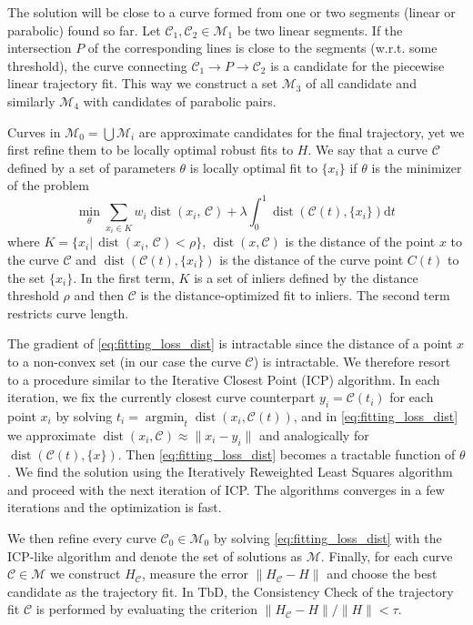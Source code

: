 \documentclass[10pt,twocolumn,letterpaper]{article}
\newcommand{\C}{\mathcal{C}}
\begin{document}
The solution will be close to a curve formed from one or two segments (linear or parabolic) found so far. Let $\C_1, \C_2 \in \mathcal{M}_1$ be two linear segments. If the intersection $P$ of the corresponding lines is close to the segments (w.r.t. some threshold), the curve connecting $\mathcal{C}_1\to P\to\mathcal{C}_2$ is a candidate for the piecewise linear trajectory fit. This way we construct a set $\mathcal{M}_3$ of all candidate and similarly $\mathcal{M}_4$ with candidates of parabolic pairs.

Curves in $\mathcal{M}_0=\bigcup\mathcal{M}_i$ are approximate candidates for the final trajectory, yet we first refine them to be locally optimal robust fits to $H$. We say that a curve $\mathcal{C}$ defined by a set of parameters $\theta$ is locally optimal fit to $\{x_i\}$ if $\theta$ is the minimizer of the problem
\begin{equation}
	\label{eq:fitting_loss_dist}
	\min_\theta \sum_{x_i\in K} w_i\operatorname{dist}(x_i,\,\mathcal{C}) + \lambda\int_0^1\operatorname{dist}(\mathcal{C}(t), \{x_i\})\mathrm{d}t\,
\end{equation}
where $K=\{x_i|\,\operatorname{dist}(x_i,\,\mathcal{C})<\rho\}$, $\operatorname{dist}(x, \C)$ is the distance of the point $x$ to the curve $\C$ and $\operatorname{dist}(\C(t), \{x_i\})$ is the distance of the curve point $C(t)$ to the set $\{x_i\}$. In the first term, $K$ is a set of inliers defined by the distance threshold $\rho$ and then $\C$ is the distance-optimized fit to inliers. The second term restricts curve length.

The gradient of \eqref{eq:fitting_loss_dist} is intractable since the distance of a point $x$ to a non-convex set (in our case the curve $\C$) is intractable. We therefore resort to a procedure similar to the Iterative Closest Point (ICP) algorithm. In each iteration, we fix the currently closest curve counterpart $y_i=\C(t_i)$ for each point $x_i$ by solving $t_i = \operatorname{argmin}_t\operatorname{dist}(x_i,\mathcal{C}(t))$, and in \eqref{eq:fitting_loss_dist} we approximate $\operatorname{dist}(x_i,\mathcal{C})\approx\|x_i-y_i\|$ and analogically for $\operatorname{dist}(\mathcal{C}(t), \{x\})$. Then \eqref{eq:fitting_loss_dist} becomes a tractable function of $\theta$. We find the solution using the Iteratively Reweighted Least Squares algorithm and proceed with the next iteration of ICP.
The algorithms converges in a few iterations and the optimization is fast.

We then refine every curve $\mathcal{C}_0\in\mathcal{M}_0$ by solving \eqref{eq:fitting_loss_dist} with the ICP-like algorithm and denote the set of solutions as $\mathcal{M}$. 
Finally, for each curve $\mathcal{C}\in\mathcal{M}$ we construct $H_\mathcal{C}$, measure the error $\|H_\mathcal{C}-H\|$ and choose the best candidate as the trajectory fit. 
In TbD, the Consistency Check of the trajectory fit $\C$ is performed by evaluating the criterion $\|H_\mathcal{C}-H\|/\|H\|<\tau$.
  
\end{document}
